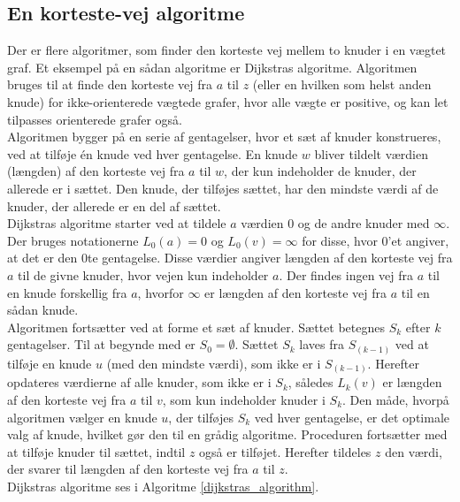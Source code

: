 \subsection{En korteste-vej algoritme}
Der er flere algoritmer, som finder den korteste vej mellem to knuder i en vægtet graf.
Et eksempel på en sådan algoritme er Dijkstras algoritme.
Algoritmen bruges til at finde den korteste vej fra $a$ til $z$ (eller en hvilken som helst anden knude) for ikke-orienterede vægtede grafer, hvor alle vægte er positive, og kan let tilpasses orienterede grafer også. \\
Algoritmen bygger på en serie af gentagelser, hvor et sæt af knuder konstrueres, ved at tilføje én knude ved hver gentagelse. 
En knude $w$ bliver tildelt værdien (længden) af den korteste vej fra $a$ til $w$, der kun indeholder de knuder, der allerede er i sættet. 
Den knude, der tilføjes sættet, har den mindste værdi af de knuder, der allerede er en del af sættet. \\
Dijkstras algoritme starter ved at tildele $a$ værdien $0$ og de andre knuder med $\infty$. 
Der bruges notationerne $L_0(a)=0$ og $L_0(v)= \infty$ for disse, hvor $0$’et angiver, at det er den $0$te gentagelse. 
Disse værdier angiver længden af den korteste vej fra $a$ til de givne knuder, hvor vejen kun indeholder $a$. 
Der findes ingen vej fra $a$ til en knude forskellig fra $a$, hvorfor $\infty$ er længden af den korteste vej fra $a$ til en sådan knude. \\
Algoritmen fortsætter ved at forme et sæt af knuder. Sættet betegnes $S_k$ efter $k$ gentagelser. 
Til at begynde med er $S_0=\emptyset$. 
Sættet $S_k$ laves fra $S_(k-1)$ ved at tilføje en knude $u$ (med den mindste værdi), som ikke er i $S_(k-1)$.
Herefter opdateres værdierne af alle knuder, som ikke er i $S_k$, således $L_k(v)$ er længden af den korteste vej fra $a$ til $v$, som kun indeholder knuder i $S_k$. 
Den måde, hvorpå algoritmen vælger en knude $u$, der tilføjes $S_k$ ved hver gentagelse, er det optimale valg af knude, hvilket gør den til en grådig algoritme. 
Proceduren fortsætter med at tilføje knuder til sættet, indtil $z$ også er tilføjet.
Herefter tildeles $z$ den værdi, der svarer til længden af den korteste vej fra $a$ til $z$. \\
Dijkstras algoritme ses i Algoritme \ref{dijkstras_algorithm}. \\

